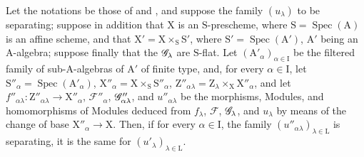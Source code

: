 \begin{lemma}[11.9.12]
\label{IV.11.9.12}
Let the notations be those of  and , and suppose the family $(u_\lambda)$ to be separating; suppose in addition that $\mathrm{X}$ is an $\mathrm{S}$-prescheme, where $\mathrm{S}=\operatorname{Spec}(\mathrm{A})$ is an affine scheme, and that $\mathrm{X}'=\mathrm{X}\times_\mathrm{S}\mathrm{S}'$, where $\mathrm{S}'=\operatorname{Spec}(\mathrm{A}')$, $\mathrm{A}'$ being an $\mathrm{A}$-algebra; suppose finally that the $\mathscr{G}_\lambda$ are $\mathrm{S}$-flat.
Let $(\mathrm{A}'_\alpha)_{\alpha\in\mathrm{I}}$ be the filtered family of sub-$\mathrm{A}$-algebras of $\mathrm{A}'$ of finite type, and, for every $\alpha\in\mathrm{I}$, let $\mathrm{S}''_\alpha=\operatorname{Spec}(\mathrm{A}'_\alpha)$, $\mathrm{X}''_\alpha=\mathrm{X}\times_\mathrm{S}\mathrm{S}''_\alpha$, $\mathrm{Z}''_{\alpha\lambda}=\mathrm{Z}_\lambda\times_\mathrm{X}\mathrm{X}''_\alpha$, and let $f''_{\alpha\lambda}:\mathrm{Z}''_{\alpha\lambda}\to\mathrm{X}''_\alpha$, $\mathscr{F}''_\alpha$, $\mathscr{G}''_{\alpha\lambda}$, and $u''_{\alpha\lambda}$ be the morphisms, Modules, and homomorphisms of Modules deduced from $f_\lambda$, $\mathscr{F}$, $\mathscr{G}_\lambda$, and $u_\lambda$ by means of the change of base $\mathrm{X}''_\alpha\to\mathrm{X}$.
Then, if for every $\alpha\in\mathrm{I}$, the family $(u''_{\alpha\lambda})_{\lambda\in\mathrm{L}}$ is separating, it is the same for $(u'_\lambda)_{\lambda\in\mathrm{L}}$.
\end{lemma}

